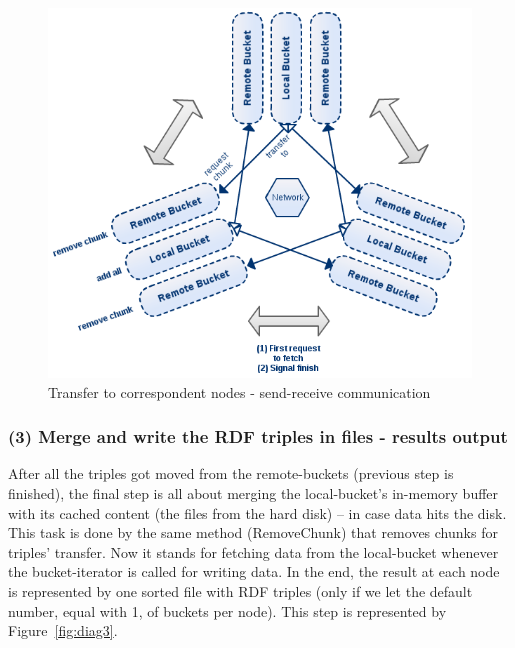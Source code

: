 \begin{figure}
\centering
\includegraphics[scale=0.6]{diag2}
\caption{Transfer to correspondent nodes - send-receive communication}
\label{fig:diag2}
\end{figure}

% 
\subsubsection*{(3) Merge and write the RDF triples in files - results output}

After all the triples got moved from the remote-buckets (previous step is finished), the final step is all about merging the local-bucket's in-memory buffer with its cached content (the files from the hard disk) -- in case data hits the disk. This task is done by the same method (RemoveChunk) that removes chunks for triples' transfer. Now it stands for fetching data from the local-bucket whenever the bucket-iterator is called for writing data. In the end, the result at each node is represented by one sorted file with RDF triples (only if we let the default number, equal with 1, of buckets per node). This step is represented by Figure~\ref{fig:diag3}.

